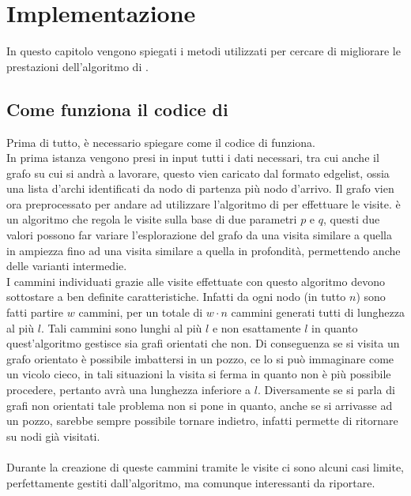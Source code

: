 %
%
%
\chapter{Implementazione}
In questo capitolo vengono spiegati i metodi utilizzati per cercare di migliorare le prestazioni dell'algoritmo di \cnrl.
\section{Come funziona il codice di \cnrl}
Prima di tutto, è necessario spiegare come il codice di \cnrl funziona.\\
In prima istanza vengono presi in input tutti i dati necessari, tra cui anche il grafo su cui si andrà a lavorare, questo vien caricato dal formato edgelist, ossia una lista d'archi identificati da nodo di partenza più nodo d'arrivo. Il grafo vien ora preprocessato per andare ad utilizzare l'algoritmo di \nv per effettuare le visite. \nv è un algoritmo che regola le visite sulla base di due parametri $p$ e $q$, questi due valori possono far variare l'esplorazione del grafo da una visita similare a quella in ampiezza fino ad una visita similare a quella in profondità, permettendo anche delle varianti intermedie.\\
I cammini individuati grazie alle visite effettuate con questo algoritmo devono sottostare a ben definite caratteristiche. Infatti da ogni nodo (in tutto $n$) sono fatti partire $w$ cammini, per un totale di $w \cdot n$ cammini generati tutti di lunghezza al più $l$. Tali cammini sono lunghi al più  $l$ e non esattamente $l$ in quanto quest'algoritmo gestisce sia grafi orientati che non. Di conseguenza se si visita un grafo orientato è possibile imbattersi in un pozzo, ce lo si può immaginare come un vicolo cieco, in tali situazioni la visita si ferma in quanto non è più possibile procedere, pertanto avrà una lunghezza inferiore a $l$. Diversamente se si parla di grafi non orientati tale problema non si pone in quanto, anche se si arrivasse ad un pozzo, sarebbe sempre possibile tornare indietro, infatti \nv permette di ritornare su nodi già visitati.\\
\\
Durante la creazione di queste cammini tramite le visite ci sono alcuni casi limite, perfettamente gestiti dall'algoritmo, ma comunque interessanti da riportare.
